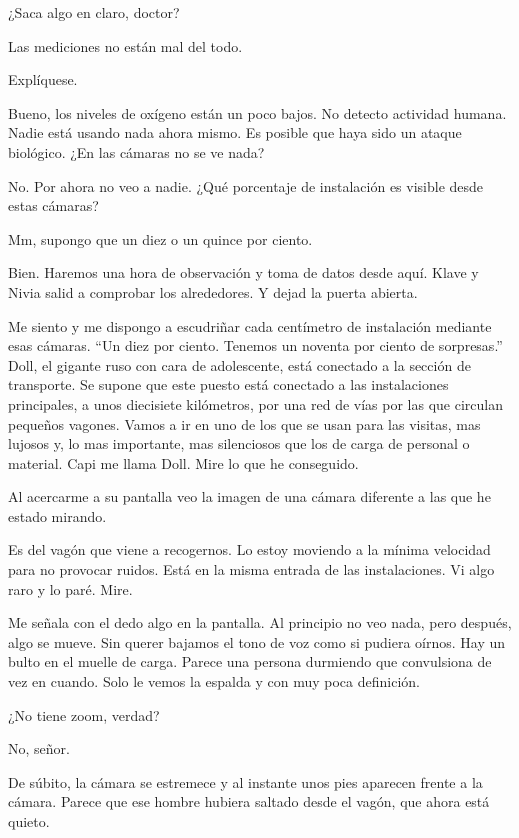 \reply ¿Saca algo en claro, doctor?

\reply Las mediciones no están mal del todo.

\reply Explíquese.

\reply Bueno, los niveles de oxígeno están un poco bajos. No detecto actividad humana. Nadie está usando nada ahora mismo. Es posible que haya sido un ataque biológico. ¿En las cámaras no se ve nada?

\reply No. Por ahora no veo a nadie. ¿Qué porcentaje de instalación es visible desde estas cámaras?

\reply Mm, supongo que un diez o un quince por ciento.

\reply Bien. Haremos una hora de observación y toma de datos desde aquí. Klave y Nivia salid a comprobar los alrededores. Y dejad la puerta abierta.

Me siento y me dispongo a escudriñar cada centímetro de instalación mediante esas cámaras. ``Un diez por ciento. Tenemos un noventa por ciento de sorpresas.'' Doll, el gigante ruso con cara de adolescente, está conectado a la sección de transporte. Se supone que este puesto está conectado a las instalaciones principales, a unos diecisiete kilómetros, por una red de vías por las que circulan pequeños vagones. Vamos a ir en uno de los que se usan para las visitas, mas lujosos y, lo mas importante, mas silenciosos que los de carga de personal o material.
\reply Capi \pause me llama Doll\pauseend. Mire lo que he conseguido.

Al acercarme a su pantalla veo la imagen de una cámara diferente a las que he estado mirando.

\reply Es del vagón que viene a recogernos. Lo estoy moviendo a la mínima velocidad para no provocar ruidos. Está en la misma entrada de las instalaciones. Vi algo raro y lo paré. Mire. 

Me señala con el dedo algo en la pantalla. Al principio no veo nada, pero después, algo se mueve. Sin querer bajamos el tono de voz como si pudiera oírnos. Hay un bulto en el muelle de carga. Parece una persona durmiendo que convulsiona de vez en cuando. Solo le vemos la espalda y con muy poca definición.

\reply ¿No tiene zoom, verdad?

\reply No, señor.

De súbito, la cámara se estremece y al instante unos pies aparecen frente a la cámara. Parece que ese hombre hubiera saltado desde el vagón, que ahora está quieto.

